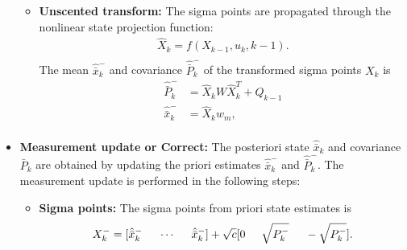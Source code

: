 \begin{itemize}
\begin{itemize}
        \item \textbf{Unscented transform:} The sigma points are propagated through the nonlinear state projection function:
        \begin{equation}
        \begin{split}
            \hat X_k = f(X_{k-1},u_k,k-1). \\
        \end{split}
        \end{equation}
        The mean $\hat{\bar x}^-_k$ and covariance $\hat{\bar P}^-_k$ of the transformed sigma points $X_k$ is 
        \begin{equation}
        	\begin{split}
            \hat{\bar P}^-_k &= \hat X_k W \hat X_k^T + Q_{k-1} \\
            \hat{\bar x}^-_k &= \hat X_k w_m, \\
            \end{split}
        \end{equation}
    \end{itemize}
        
    \item \textbf{Measurement update or Correct:} The posteriori state $\hat{\bar x}_k$ and covariance ${\bar P}_k$ are obtained by updating the priori estimates $\hat{\bar x}^-_k$ and $\hat{\bar P}^-_k$. The measurement update is performed in the following steps:
    \begin{itemize}
        \item \textbf{Sigma points:} The sigma points from priori state estimates is
        \begin{equation}
        X_k^- = [ \hat{\bar{x}}_k^- \hspace{5mm} \cdots \hspace{5mm} \hat{\bar{x}}_k^-]+ \sqrt c [ 0 \hspace{5mm} \sqrt{P_k^-} \hspace{5mm} - \sqrt{P_k^-} ].
        \end{equation}


\end{itemize}
\end{itemize}
